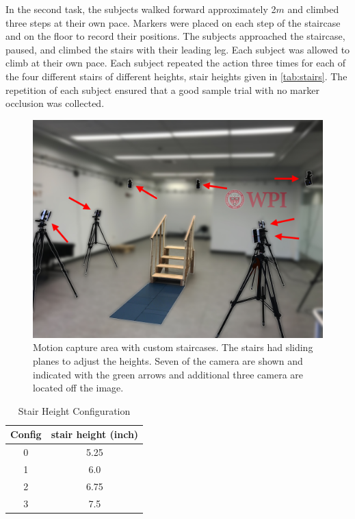  In the second task, the subjects walked forward approximately 2$m$ and climbed three steps at their own pace. Markers were placed on each step of the staircase and on the floor to record their positions. The subjects approached the staircase, paused, and climbed the stairs with their leading leg. Each subject was allowed to climb at their own pace. Each subject repeated the action three times for each of the four different stairs of different heights, stair heights given in \autoref{tab:stairs}. The repetition of each subject ensured that a good sample trial with no marker occlusion was collected.   
 \begin{figure}[h]
    \centering 
    \includegraphics[scale=0.1,frame]{images/gait_data/stairs_EDIT.jpg}
    \caption[Motion Capture Area]{Motion capture area with custom staircases. The stairs had sliding planes to adjust the heights. Seven of the camera are shown and indicated with the green arrows and additional three camera are located off the image.  }
    \label{fig:mocap} 
\end{figure} 
 
\begin{table}[h!]
\centering
\large
 \begin{tabular}{||c c ||} 
 \hline
 Config & stair height (inch) \\ [0.5ex] 
 \hline\hline
 0 & 5.25  \\ 
 \hline
 1 & 6.0  \\
 \hline
 2 & 6.75  \\
 \hline
 3 & 7.5 \\
 \hline
\end{tabular}
\caption{Stair Height Configuration}
\label{tab:stairs}
\end{table}



